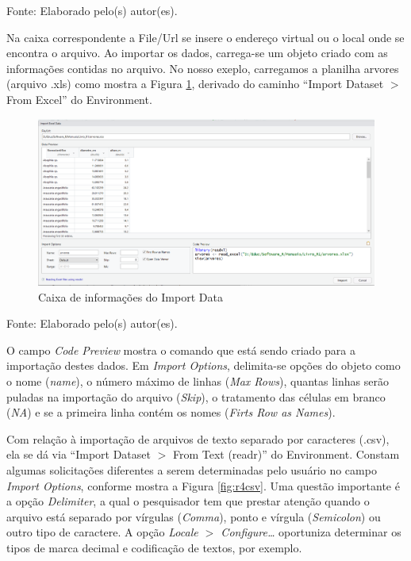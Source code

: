 \documentclass[12pt,brazil,oneside]{book}
\begin{document}
Fonte: Elaborado pelo(s) autor(es).

Na caixa correspondente a File/Url se insere o endereço virtual ou o local onde se encontra o arquivo. Ao importar os dados, carrega-se um objeto criado com as informações contidas no arquivo. No nosso exeplo, carregamos a planilha arvores (arquivo .xls) como mostra a Figura \ref{fig:r4}, derivado do caminho ``Import Dataset \(>\) From Excel'' do Environment.

\begin{figure}[H]

{\centering \includegraphics[width=0.8\linewidth]{r4} 

}

\caption{Caixa de informações do Import Data}\label{fig:r4}
\end{figure}

Fonte: Elaborado pelo(s) autor(es).

O campo \emph{Code Preview} mostra o comando que está sendo criado para a importação destes dados. Em \emph{Import Options}, delimita-se opções do objeto como o nome (\emph{name}), o número máximo de linhas (\emph{Max Rows}), quantas linhas serão puladas na importação do arquivo (\emph{Skip}), o tratamento das células em branco (\emph{NA}) e se a primeira linha contém os nomes (\emph{Firts Row as Names}).

Com relação à importação de arquivos de texto separado por caracteres (.csv), ela se dá via ``Import Dataset \(>\) From Text (readr)'' do Environment. Constam algumas solicitações diferentes a serem determinadas pelo usuário no campo \emph{Import Options}, conforme mostra a Figura \ref{fig:r4csv}. Uma questão importante é a opção \emph{Delimiter}, a qual o pesquisador tem que prestar atenção quando o arquivo está separado por vírgulas (\emph{Comma}), ponto e vírgula (\emph{Semicolon}) ou outro tipo de caractere. A opção \emph{Locale \(>\) Configure\ldots{}} oportuniza determinar os tipos de marca decimal e codificação de textos, por exemplo.
\end{document}

